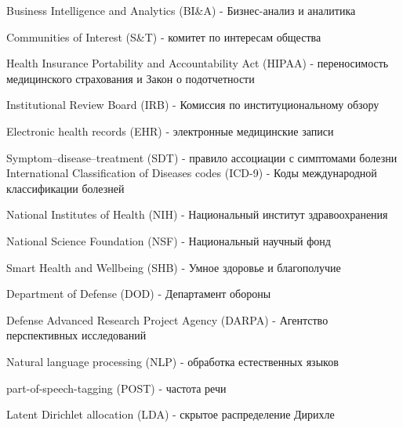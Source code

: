 Business Intelligence and Analytics (BI\&A) - Бизнес-анализ и аналитика

Communities of Interest (S\&T) - комитет по интересам общества

Health Insurance Portability and Accountability Act (HIPAA) - переносимость медицинского страхования и
Закон о подотчетности

Institutional Review Board (IRB) - Комиссия по институциональному обзору

Electronic health records (EHR) - электронные медицинские записи

Symptom–disease–treatment (SDT) - правило ассоциации с симптомами болезни
International Classification of Diseases codes (ICD-9) - Коды международной классификации болезней

National Institutes of Health (NIH) - Национальный институт здравоохранения

National Science Foundation (NSF) - Национальный научный фонд

Smart Health and Wellbeing (SHB) - Умное здоровье и благополучие

Department of Defense (DOD) - Департамент обороны

Defense Advanced Research Project Agency (DARPA) - Агентство перспективных исследований

Natural language processing (NLP) - обработка естественных языков

part-of-speech-tagging (POST) - частота речи

Latent Dirichlet allocation (LDA) - скрытое распределение Дирихле